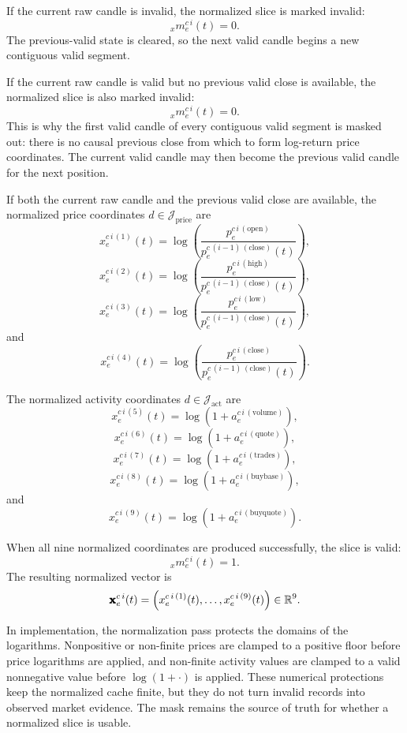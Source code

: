 If the current raw candle is invalid, the normalized slice is marked invalid:
\[
  {}_{x}m_{e}^{c\,i}(t)=0.
\]
The previous-valid state is cleared, so the next valid candle begins a new
contiguous valid segment.

If the current raw candle is valid but no previous valid close is available,
the normalized slice is also marked invalid:
\[
  {}_{x}m_{e}^{c\,i}(t)=0.
\]
This is why the first valid candle of every contiguous valid segment is masked
out: there is no causal previous close from which to form log-return price
coordinates.  The current valid candle may then become the previous valid candle
for the next position.

If both the current raw candle and the previous valid close are available, the
normalized price coordinates $d\in\mathcal{J}_{\mathrm{price}}$ are
\[
  x_{e}^{c\,i\,(1)}(t)
  =
  \log
  \left(
    \frac{
      p_{e}^{c\,i\,(\mathrm{open})}
    }{
      p_{e}^{c\,(i-1)\,(\mathrm{close})}(t)
    }
  \right),
\]
\[
  x_{e}^{c\,i\,(2)}(t)
  =
  \log
  \left(
    \frac{
      p_{e}^{c\,i\,(\mathrm{high})}
    }{
      p_{e}^{c\,(i-1)\,(\mathrm{close})}(t)
    }
  \right),
\]
\[
  x_{e}^{c\,i\,(3)}(t)
  =
  \log
  \left(
    \frac{
      p_{e}^{c\,i\,(\mathrm{low})}
    }{
      p_{e}^{c\,(i-1)\,(\mathrm{close})}(t)
    }
  \right),
\]
and
\[
  x_{e}^{c\,i\,(4)}(t)
  =
  \log
  \left(
    \frac{
      p_{e}^{c\,i\,(\mathrm{close})}
    }{
      p_{e}^{c\,(i-1)\,(\mathrm{close})}(t)
    }
  \right).
\]

The normalized activity coordinates $d\in\mathcal{J}_{\mathrm{act}}$ are
\[
  x_{e}^{c\,i\,(5)}(t)
  =
  \log
  \left(
    1+a_{e}^{c\,i\,(\mathrm{volume})}
  \right),
\]
\[
  x_{e}^{c\,i\,(6)}(t)
  =
  \log
  \left(
    1+a_{e}^{c\,i\,(\mathrm{quote})}
  \right),
\]
\[
  x_{e}^{c\,i\,(7)}(t)
  =
  \log
  \left(
    1+a_{e}^{c\,i\,(\mathrm{trades})}
  \right),
\]
\[
  x_{e}^{c\,i\,(8)}(t)
  =
  \log
  \left(
    1+a_{e}^{c\,i\,(\mathrm{buybase})}
  \right),
\]
and
\[
  x_{e}^{c\,i\,(9)}(t)
  =
  \log
  \left(
    1+a_{e}^{c\,i\,(\mathrm{buyquote})}
  \right).
\]

When all nine normalized coordinates are produced successfully, the slice is
valid:
\[
  {}_{x}m_{e}^{c\,i}(t)=1.
\]
The resulting normalized vector is
\[
  \pmb{\mathbf{x}}_{e}^{c\,i}(t)
  =
  \left(
    x_{e}^{c\,i\,(1)}(t),
    \ldots,
    x_{e}^{c\,i\,(9)}(t)
  \right)
  \in
  \mathbb{R}^9.
\]

In implementation, the normalization pass protects the domains of the
logarithms.  Nonpositive or non-finite prices are clamped to a positive floor
before price logarithms are applied, and non-finite activity values are clamped
to a valid nonnegative value before $\log(1+\cdot)$ is applied.  These numerical
protections keep the normalized cache finite, but they do not turn invalid
records into observed market evidence.  The mask remains the source of truth
for whether a normalized slice is usable.


